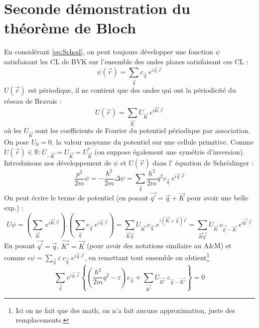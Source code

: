 	\section{Seconde démonstration du théorème de Bloch}
	En considérant \autoref{eq:Schod}, on peut toujours développer 
	une fonction $\psi$ satisfaisant les CL de BVK sur l'ensemble 
	des ondes planes satisfaisant ces CL :
	\begin{equation}
	\psi(\vec{r}) = \sum_{\vec{q}} c_{\vec{q}}\ e^{i\vec{q}.\vec{r}}
	\end{equation}
	$U(\vec{r})$ est périodique, il ne contient que des ondes qui 
	ont la périodicité du réseau de Bravais :
	\begin{equation}
	U(\vec{r}) = \sum_{\vec{K}} U_{\vec{K}}\ e^{i\vec{K}.\vec{r}}
	\end{equation}
	où les $U_{\vec{K}}$ sont les coefficients de Fourier du potentiel 
	périodique par association. On pose $U_0=0$, la valeur moyenne 
	du potentiel sur une cellule primitive. Comme $U(\vec{r}) \in 
	\mathbb{R} : U_{-\vec{K}}=U_{\vec{K}}=U_{\vec{K}}^*$ (on suppose 
	également une symétrie d'inversion).\\
	Introduisons nos développement de $\psi$ et $U(\vec{r})$ dans l'
	équation de Schrödinger :
	\begin{equation}
	\frac{p^2}{2m}\psi = -\frac{\hbar^2}{2m}\Delta \psi = \sum_{\vec q}
	\frac{\hbar^2}{2m}q^2c_{\vec{q}}\ e^{i\vec{q}\ \vec{r}} 
	\end{equation}
	On peut écrire le terme de potentiel (en posant $\vec{q'}=\vec{q}+
	\vec{K}$ pour avoir une belle exp.) :
	\begin{equation}
	U\psi = \left(\sum_{\vec{K}}\ e^{i\vec{K}.\vec{r}}\right).\left(
	\sum_{\vec{q}} c_{\vec{q}}\ e^{i\vec{q}.\vec{r}}\right) = \sum_{
	\vec{K}\vec{q}} U_{\vec{K}}.c_{\vec{q}}.e^{i(\vec{K}+\vec{q})\vec{r}}
	= \sum_{\vec{K}\vec{q'}}U_{\vec{K}}\ c_{\vec{q'}-\vec{K}}\ e^{i
	\vec{q'}.\vec{r}}
	\end{equation}
	En posant $\vec{q'}=\vec{q}$, $\vec{K'}=\vec{K}$ (pour avoir des 
	notations similaire au A\&M) et comme $\displaystyle\epsilon\psi = 
	\sum_{\vec{q}} 	\varepsilon\ c_{\vec{q}}\ e^{i\vec{q}.\vec{r}} $, 
	en remettant tout ensemble on obtient\footnote{Ici on ne fait que 
	des math, on n'a fait aucune approximation, juste des remplacements.}
	\begin{equation}
	\sum_{\vec{q}}e^{i\vec{q}.\vec{r}}\left\{\left(\frac{\hbar^2}{2m}q^2
	-\varepsilon\right)c_{\vec{q}} + \sum_{\vec{K'}}U_{\vec{K'}}\ c_{\vec{
	q}-\vec{K'}}\right\}=0
	\end{equation}
